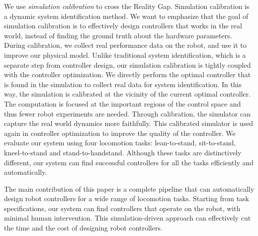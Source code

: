 
We use \emph{simulation calibration} to cross the Reality Gap. Simulation calibration is a dynamic system identification method. We want to emphasize that the goal of simulation calibration is to effectively design controllers that works in the real world, instead of finding the ground truth about the hardware parameters. During calibration, we collect real performance data on the robot, and use it to improve our physical model. Unlike traditional system identification, which is a separate step from controller design, our simulation calibration is tightly coupled with the controller optimization. We directly perform the optimal controller that is found in the simulation to collect real data for system identification. In this way, the simulation is calibrated at the vicinity of the current optimal controller. The computation is focused at the important regions of the control space and thus fewer robot experiments are needed. Through calibration, the simulator can capture the real world dynamics more faithfully. This calibrated simulator is used again in controller optimization to improve the quality of the controller. We evaluate our system using four locomotion tasks: lean-to-stand, sit-to-stand, kneel-to-stand and stand-to-handstand. Although these tasks are distinctively different, our system can find successful controllers for all the tasks efficiently and automatically. 

The main contribution of this paper is a complete pipeline that can automatically design robot controllers for a wide range of locomotion tasks. Starting from task specifications, our system can find controllers that operate on the robot, with minimal human intervention. This simulation-driven approach can effectively cut the time and the cost of designing robot controllers. 
